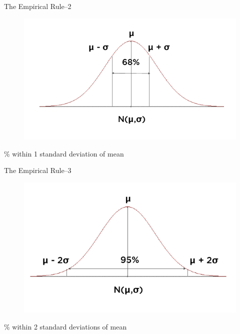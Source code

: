\begin{frame}[t]{The Empirical Rule--2}
	
	\begin{figure} [ht]
		\centering
		\includegraphics[trim={0 1cm 0 0}, clip, scale=0.4]{eda/nd7.png}
	\end{figure}
	
	\% within 1 standard deviation of mean
	
\end{frame}

\begin{frame}[t]{The Empirical Rule--3}
	
	\begin{figure} [ht]
		\centering
		\includegraphics[trim={0 1cm 0 0}, clip, scale=0.4]{eda/nd8.png}
	\end{figure}
	
	\% within 2 standard deviations of mean
	
\end{frame}


